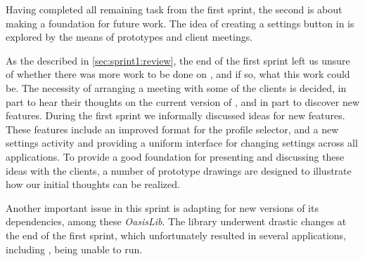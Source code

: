 Having completed all remaining task from the first sprint, the second is about making a foundation for future work.
The idea of creating a settings button in \launcher is explored by the means of prototypes and client meetings.

As the described in \cref{sec:sprint1:review}, the end of the first sprint left us unsure of whether there was more work to be done on \launcher, and if so, what this work could be. 
The necessity of arranging a meeting with some of the clients is decided, in part to hear their thoughts on the current version of \launcher, and in part to discover new features.
During the first sprint we informally discussed ideas for new features.
These features include an improved format for the profile selector, and a new settings activity and providing a uniform interface for changing settings across all applications. 
To provide a good foundation for presenting and discussing these ideas with the clients, a number of prototype drawings are designed to illustrate how our initial thoughts can be realized.

Another important issue in this sprint is adapting \launcher for new versions of its dependencies, among these \textit{OasisLib}.
The library underwent drastic changes at the end of the first sprint, which unfortunately resulted in several applications, including \launcher, being unable to run.
